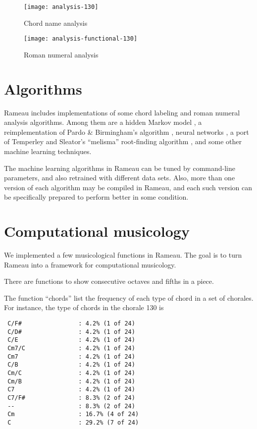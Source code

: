 \begin{figure}
  \centering
  \texttt{[image: analysis-130]}
  \caption{Chord name analysis}
  \label{fig:chord-name-analysis}
\end{figure}
\begin{figure}
  \centering
  \texttt{[image: analysis-functional-130]}  
  \caption{Roman numeral analysis}
  \label{fig:roman-analysis}
\end{figure}

\section{Algorithms}
\label{sec:algorithms}

Rameau includes implementations of some chord labeling and roman
numeral analysis algorithms. Among them are a hidden Markov model
\cite{raphael.ea03:harmonic}, a reimplementation of Pardo \&
Birmingham's algorithm \cite{pardo.ea99:automated}, neural networks
\cite{tsui02:harmonic}, a port of Temperley and Sleator's ``melisma''
root-finding algorithm \cite{temperley.ea99:modeling}, and some other
machine learning techniques.

The machine learning algorithms in Rameau can be tuned by command-line
parameters, and also retrained with different data sets. Also, more
than one version of each algorithm may be compiled in Rameau, and each
such version can be specifically prepared to perform better in some
condition.



\section{Computational musicology}
\label{sec:comp-music}


We implemented a few musicological functions in Rameau. The goal is to
turn Rameau into a framework for computational musicology. 

There are functions to show consecutive octaves and fifths in a piece.

The function ``chords'' list the frequency of each type of chord in a
set of chorales. For instance, the type of chords in the chorale 130
is

\begin{verbatim}
 C/F#                : 4.2% (1 of 24)
 C/D#                : 4.2% (1 of 24)
 C/E                 : 4.2% (1 of 24)
 Cm7/C               : 4.2% (1 of 24)
 Cm7                 : 4.2% (1 of 24)
 C/B                 : 4.2% (1 of 24)
 Cm/C                : 4.2% (1 of 24)
 Cm/B                : 4.2% (1 of 24)
 C7                  : 4.2% (1 of 24)
 C7/F#               : 8.3% (2 of 24)
 --                  : 8.3% (2 of 24)
 Cm                  : 16.7% (4 of 24)
 C                   : 29.2% (7 of 24)
\end{verbatim}

